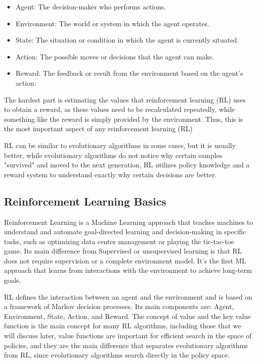 \begin{itemize}
\item Agent: The decision-maker who performs actions.
\item Environment: The world or system in which the agent operates.
\item State: The situation or condition in which the agent is currently situated.
\item Action: The possible moves or decisions that the agent can make.
\item Reward: The feedback or result from the environment based on the agent's action.
\end{itemize} 


The hardest part is estimating the values that reinforcement learning (RL) uses to obtain a reward, as these values need to be recalculated repeatedly, while something like the reward is simply provided by the environment. Thus, this is the most important aspect of any reinforcement learning (RL)


RL can be similar to evolutionary algorithms in some cases, but it is usually better, while evolutionary algorithms do not notice why certain samples "survived" and moved to the next generation, RL utilizes policy knowledge and a reward system to understand exactly why certain decisions are better.

\subsection{Reinforcement Learning Basics}

Reinforcement Learning is a Machine Learning approach that teaches machines to understand and automate goal-directed learning and decision-making in specific tasks, such as optimizing data center management or playing the tic-tac-toe game. Its main difference from Supervised or unsupervised learning is that RL does not require supervision or a complete environment model. It's the first ML approach that learns from interactions with the environment to achieve long-term goals.

RL defines the interaction between an agent and the environment and is based on a framework of Markov decision processes. Its main components are: Agent, Environment, State, Action, and Reward. The concept of value and the key value function is the main concept for many RL algorithms, including those that we will discuss later, value functions are important for efficient search in the space of policies, and they are the main difference that separates evolutionary algorithms from RL, since evolutionary algorithms search directly in the policy space.



